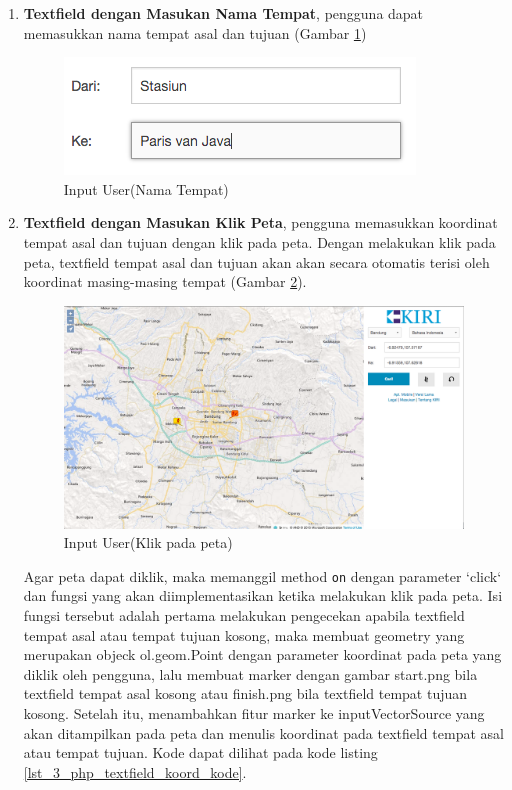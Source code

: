 \begin{enumerate}
	\item \textbf{Textfield dengan Masukan Nama Tempat}, pengguna dapat memasukkan nama tempat asal dan tujuan (Gambar \ref{fig:3_KIRI_textfield_nama})
	
	\begin{figure}[H]
		\centering
		\includegraphics[scale=0.5]{Gambar/KIRI-textfield-nama}
		\caption{Input User(Nama Tempat)} 
		\label{fig:3_KIRI_textfield_nama}
	\end{figure}
	
	\item \textbf{Textfield dengan Masukan Klik Peta}, pengguna memasukkan koordinat tempat asal dan tujuan dengan klik pada peta. Dengan melakukan klik pada peta, textfield tempat asal dan tujuan akan akan secara otomatis terisi oleh koordinat masing-masing tempat (Gambar \ref{fig:3_KIRI_textfield_koord}).
	
	\begin{figure}[H]
		\centering
		\includegraphics[scale=0.3]{Gambar/KIRI-textfield-koord}
		\caption{Input User(Klik pada peta)} 
		\label{fig:3_KIRI_textfield_koord}
	\end{figure}
	
	Agar peta dapat diklik, maka memanggil method \verb!on! dengan parameter `click` dan fungsi yang akan diimplementasikan ketika melakukan klik pada peta. Isi fungsi tersebut adalah pertama melakukan pengecekan apabila textfield tempat asal atau tempat tujuan kosong, maka membuat geometry yang merupakan objeck ol.geom.Point dengan parameter koordinat pada peta yang diklik oleh pengguna, lalu membuat marker dengan gambar start.png bila textfield tempat asal kosong atau finish.png bila textfield tempat tujuan kosong. Setelah itu, menambahkan fitur marker ke inputVectorSource yang akan ditampilkan pada peta dan menulis koordinat pada textfield tempat asal atau tempat tujuan. Kode dapat dilihat pada kode listing \ref{lst_3_php_textfield_koord_kode}.
	

\end{enumerate}
